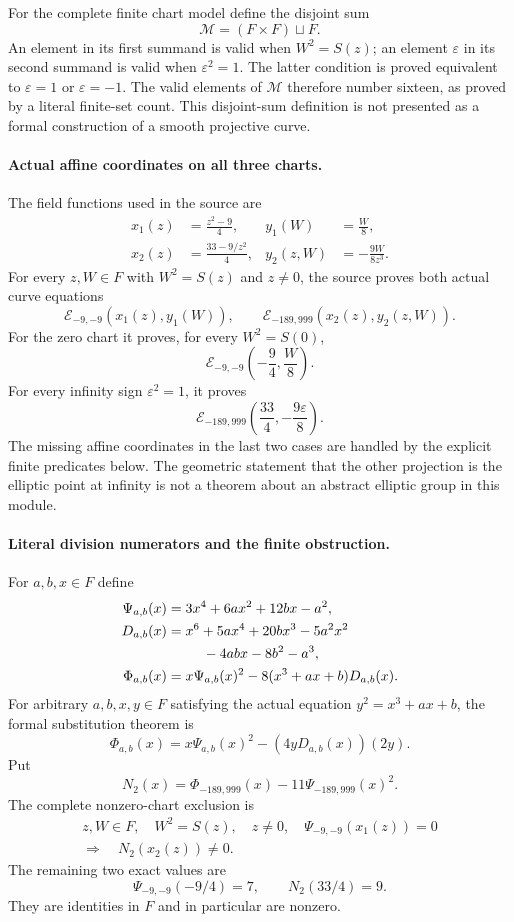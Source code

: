 For the complete finite chart model define the disjoint sum
\[
 \mathcal M=(F\times F)\sqcup F.
\]
An element in its first summand is valid when $W^2=S(z)$;
an element $\varepsilon$ in its second summand is valid when
$\varepsilon^2=1$. The latter condition is proved equivalent to
$\varepsilon=1$ or $\varepsilon=-1$. The valid elements of
$\mathcal M$ therefore number sixteen, as proved by a literal
finite-set count. This disjoint-sum definition is not presented
as a formal construction of a smooth projective curve.

\paragraph{Actual affine coordinates on all three charts.}
The field functions used in the source are
\[
 \begin{aligned}
 x_1(z)&=\frac{z^2-9}{4},&
 y_1(W)&=\frac W8,\\
 x_2(z)&=\frac{33-9/z^2}{4},&
 y_2(z,W)&=-\frac{9W}{8z^3}.
 \end{aligned}
\]
For every $z,W\in F$ with $W^2=S(z)$ and $z\ne0$, the source proves
both actual curve equations
\[
 \mathcal E_{-9,-9}(x_1(z),y_1(W)),\qquad
 \mathcal E_{-189,999}(x_2(z),y_2(z,W)).
\]
For the zero chart it proves, for every $W^2=S(0)$,
\[
 \mathcal E_{-9,-9}\left(-\frac94,\frac W8\right).
\]
For every infinity sign $\varepsilon^2=1$, it proves
\[
 \mathcal E_{-189,999}\left(\frac{33}{4},-\frac{9\varepsilon}{8}\right).
\]
The missing affine coordinates in the last two cases are handled
by the explicit finite predicates below. The geometric statement
that the other projection is the elliptic point at infinity is
not a theorem about an abstract elliptic group in this module.

\paragraph{Literal division numerators and the finite obstruction.}
For $a,b,x\in F$ define
\[
 \begin{aligned}
 \Psi_{a,b}(x)&=3x^4+6ax^2+12bx-a^2,\\
 D_{a,b}(x)&=x^6+5ax^4+20bx^3-5a^2x^2\\
           &\hspace{9mm}-4abx-8b^2-a^3,\\
 \Phi_{a,b}(x)&=x\Psi_{a,b}(x)^2
                  -8(x^3+ax+b)D_{a,b}(x).
 \end{aligned}
\]
For arbitrary $a,b,x,y\in F$ satisfying the actual equation
$y^2=x^3+ax+b$, the formal substitution theorem is
\[
 \Phi_{a,b}(x)
 =x\Psi_{a,b}(x)^2-(4yD_{a,b}(x))(2y).
\]
Put
\[
 N_2(x)=\Phi_{-189,999}(x)-11\Psi_{-189,999}(x)^2.
\]
The complete nonzero-chart exclusion is
\[
 \begin{gathered}
 z,W\in F,\quad W^2=S(z),\quad z\ne0,\quad
 \Psi_{-9,-9}(x_1(z))=0\\
 \Longrightarrow\quad N_2(x_2(z))\ne0.
 \end{gathered}
\]
The remaining two exact values are
\[
 \Psi_{-9,-9}(-9/4)=7,\qquad N_2(33/4)=9.
\]
They are identities in $F$ and in particular are nonzero.

